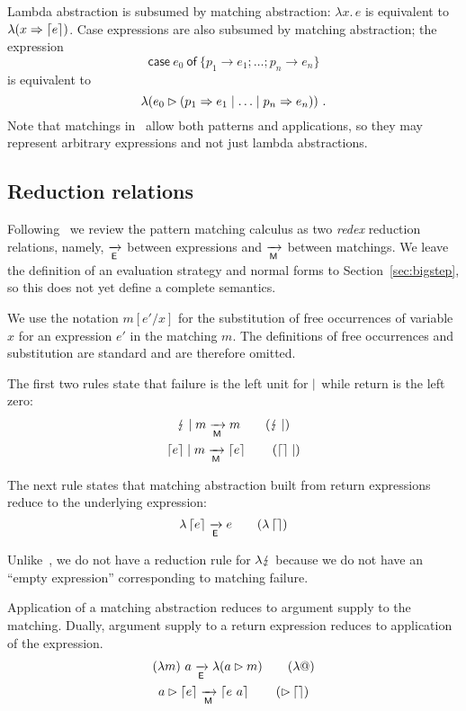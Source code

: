 Lambda abstraction is subsumed by matching abstraction:
$\lambda x.\, e$ is equivalent to
$\lambda (x \Rightarrow \left\lceil e\right\rceil)$.  Case expressions are also
subsumed by matching abstraction; the expression
\[
  \textsf{case}~ e_0 ~\textsf{of}~\{p_1\to e_1;\ldots; p_n\to e_n\}
\]
is equivalent to
\[
  \lambda(e_0\rhd (p_1 \Rightarrow e_1\mid\ldots \mid p_n \Rightarrow e_n)) \ .
\]
%
Note that matchings in \lambdaPMC\ allow both patterns and
applications, so they may represent arbitrary expressions
and not just lambda abstractions.  


\subsection{Reduction relations}\label{sec:reduction}
%
Following~\cite{kahl_2004} we review the pattern matching calculus as
two \emph{redex} reduction relations, namely, $\xrightarrow[\textsf{E}]{}$ between expressions and
$\xrightarrow[\textsf{M}]{}$ between matchings. We leave the definition of an evaluation
strategy and normal forms to Section~\ref{sec:bigstep}, so this does
not yet define a complete semantics.

We use the notation $m[e'/x]$ for the substitution of free occurrences
of variable $x$ for an expression $e'$ in the matching $m$.
The definitions of free occurrences and substitution are standard and
are therefore omitted.

The first two rules state that failure is the left unit for
$\mid$ while return is the left zero:
\begin{gather}
  \matchalt{\matchfail}{m} \matred m \tag{$\matchfail\amatchalt$}  \\
  \matchalt{\matchreturn{e}}{m} \matred \matchreturn{e} \tag{$\matchreturn{}\amatchalt$}
\end{gather}

The next rule states that matching abstraction built from return
expressions reduce to the underlying expression:
\begin{equation}
  \lambda \matchreturn{e} \expred e  \tag{$\lambda\matchreturn{}$} 
\end{equation}

Unlike~\cite{kahl_2004}, we do not have a reduction rule for
$\lambda \lightning$ because we do not have an ``empty expression''
corresponding to matching failure.

Application of a matching abstraction reduces to argument supply to
the matching.  Dually, argument supply to a return expression reduces
to application of the expression.
\begin{gather}
  (\lambda m)~ a \expred \lambda(\matcharg{a}{m}) \tag{$\lambda @$}\\
  \matcharg{a}{\matchreturn{e}} \matred \matchreturn{e~a} \tag{$\amatcharg\matchreturn{}$} 
\end{gather}

